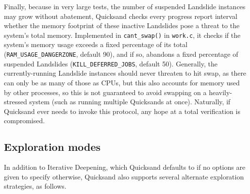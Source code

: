 Finally, because in very large tests,
the number of suspended Landslide instances may grow without abatement,
Quicksand checks every progress report interval whether the memory footprint of these inactive Landslides
pose a threat to the system's total memory.
Implemented in {\tt cant\_swap()} \cite{cant-stop} in {\tt work.c},
it checks if the system's memory usage exceeds a fixed percentage of its total
({\tt RAM\_USAGE\_DANGERZONE}, default 90),
and if so,
abandons a fixed percentage of suspended Landslides
({\tt KILL\_DEFERRED\_JOBS}, default 50).
%
Generally, the currently-running Landslide instances should never threaten to hit swap,
as there can only be as many of those as CPUs,
but this also accounts for memory used by other processes,
so this is not guaranteed to avoid swapping on a heavily-stressed system
(such as running multiple Quicksands at once).
Naturally, if Quicksand ever needs to invoke this protocol,
any hope at a total verification is compromised.

\subsection{Exploration modes}
\label{sec:quicksand-impl-modes}

In addition to Iterative Deepening,
which Quicksand defaults to if no options are given to specify otherwise,
Quicksand also supports several alternate exploration strategies, as follows.

